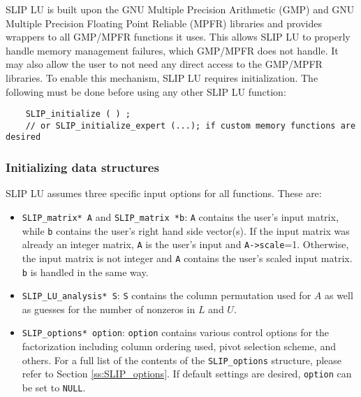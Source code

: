 \documentclass[12pt]{article}
\theoremstyle{definition}
\begin{document}
SLIP LU is built upon the GNU Multiple Precision Arithmetic (GMP)
\cite{granlund2015gnu} and GNU Multiple Precision Floating Point Reliable
(MPFR) \cite{fousse2007mpfr} libraries and provides wrappers to all GMP/MPFR
functions it uses.  This allows SLIP LU to properly handle memory management
failures, which GMP/MPFR does not handle.  It may also allow the user to not
need any direct access to the GMP/MPFR libraries.  To enable this mechanism,
SLIP LU requires initialization.  The following must be done before using any
other SLIP LU function:

\begin{mdframed}[userdefinedwidth=6in]
{\footnotesize
\begin{verbatim}
    SLIP_initialize ( ) ;
    // or SLIP_initialize_expert (...); if custom memory functions are desired
\end{verbatim}
} \end{mdframed}

\subsubsection{Initializing data structures}
\label{ss:init}

SLIP LU assumes three specific input options for all functions. These are:

\begin{itemize}
\item \verb|SLIP_matrix* A| and \verb|SLIP_matrix *b|: \verb|A| contains the
user's input matrix, while \verb|b| contains the user's right hand side
vector(s). If the input matrix was already an integer matrix, \verb|A| is the
user's input and \verb|A->scale|=1. Otherwise, the input matrix is not integer
and \verb|A| contains the user's scaled input matrix. \verb|b| is handled in
the same way.

\item \verb|SLIP_LU_analysis* S|: \verb|S| contains the column permutation used
for $A$ as well as guesses for the number of nonzeros in $L$ and $U$.

\item \verb|SLIP_options* option|: \verb|option| contains various control
options for the factorization including column ordering used, pivot selection
scheme, and others. For a full list of the contents of the \verb|SLIP_options|
structure, please refer to Section \ref{ss:SLIP_options}.
If default settings are desired, \verb|option| can be set to \verb|NULL|.

\end{itemize}
\end{document}
